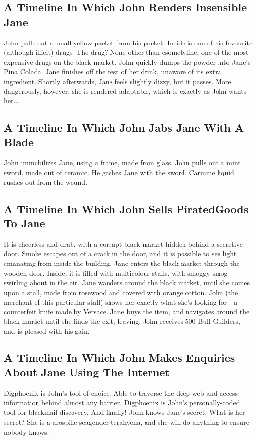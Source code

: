 \documentclass{article}
\begin{document}
\subsection{A Timeline In Which John Renders Insensible Jane}


John pulls out a small yellow packet from his pocket. Inside is one of his favourite (although illicit) drugs.
The drug? None other than esometyline, one of the most expensive drugs on the black market.
John quickly dumps the powder into Jane's Pina Colada.
Jane finishes off the rest of her drink, unaware of its extra ingredient.
Shortly afterwards, Jane feels slightly dizzy, but it passes.
More dangerously, however, she is rendered adaptable, which is exactly as John wants her...
\subsection{A Timeline In Which John Jabs Jane With A Blade}


John immobilizes Jane, using a frame, made from glass.
John pulls out a mint sword, made out of ceramic.
He gashes Jane with the sword.
Carmine liquid rushes out from the wound.
\subsection{A Timeline In Which John Sells PiratedGoods To Jane}


It is cheerless and drab, with a corrupt black market hidden behind a secretive door.
Smoke escapes out of a crack in the door, and it is possible to see light emanating from inside the building.
Jane enters the black market through the wooden door.
Inside, it is filled with multicolour stalls, with smoggy smog swirling about in the air.
Jane wanders around the black market, until she comes upon a stall, made from rosewood and covered with orange cotton.
John (the merchant of this particular stall) shows her exactly what she's looking for {-} a counterfeit knife made by Versace.
Jane buys the item, and navigates around the black market until she finds the exit, leaving.
John receives 500 Bull Guilders, and is pleased with his gain.
\subsection{A Timeline In Which John Makes Enquiries About Jane Using The Internet}


Digphoenix is John's tool of choice. Able to traverse the deep{-}web and access information behind almost any barrier, Digphoenix is John's personally{-}coded tool for blackmail discovery.
And finally!
John knows Jane's secret. What is her secret? She is a arospike seagender terahyena, and she will do anything to ensure nobody knows.
\end{document}
